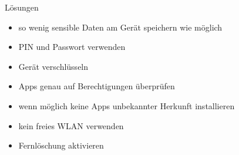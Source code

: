 \begin{frame}{}
  \begin{center}
  \end{center}
\end{frame}

\begin{frame}{Lösungen}
	\begin{itemize}
		\item<1-> so wenig sensible Daten am Gerät speichern wie möglich
		\item<2-> PIN und Passwort verwenden
		\item<3-> Gerät verschlüsseln
		\item<4-> Apps genau auf Berechtigungen überprüfen
		\item<5-> wenn möglich keine Apps unbekannter Herkunft installieren
		\item<6-> kein freies WLAN verwenden
		\item<7-> Fernlöschung aktivieren
	\end{itemize}
\end{frame}
